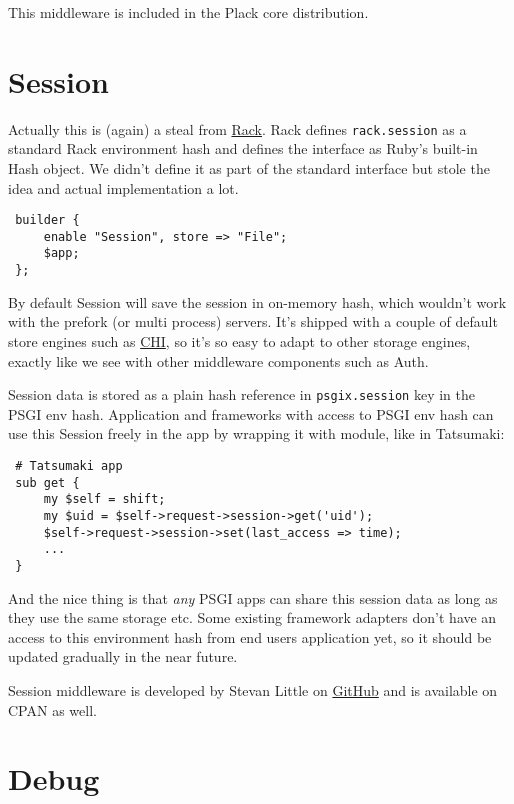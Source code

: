 This middleware is included in the Plack core distribution.

\section{Session}\label{session}

Actually this is (again) a steal from
\href{http://rack.rubyforge.org/}{Rack}. Rack defines
\lstinline!rack.session! as a standard Rack environment hash and defines
the interface as Ruby's built-in Hash object. We didn't define it as
part of the standard interface but stole the idea and actual
implementation a lot.

\begin{lstlisting}
 builder {
     enable "Session", store => "File";
     $app;
 };
\end{lstlisting}

By default Session will save the session in on-memory hash, which
wouldn't work with the prefork (or multi process) servers. It's shipped
with a couple of default store engines such as
\href{http://search.cpan.org/perldoc?CHI}{CHI}, so it's so easy to adapt
to other storage engines, exactly like we see with other middleware
components such as Auth.

Session data is stored as a plain hash reference in
\lstinline!psgix.session! key in the PSGI env hash. Application and
frameworks with access to PSGI env hash can use this Session freely in
the app by wrapping it with  module, like in Tatsumaki:

\begin{lstlisting}
 # Tatsumaki app
 sub get {
     my $self = shift;
     my $uid = $self->request->session->get('uid');
     $self->request->session->set(last_access => time);
     ...
 }
\end{lstlisting}

And the nice thing is that \emph{any} PSGI apps can share this session
data as long as they use the same storage etc. Some existing framework
adapters don't have an access to this environment hash from end users
application yet, so it should be updated gradually in the near future.

Session middleware is developed by Stevan Little on
\href{http://github.com/stevan/plack-middleware-session}{GitHub} and is
available on CPAN as well.

\section{Debug}\label{debug}

